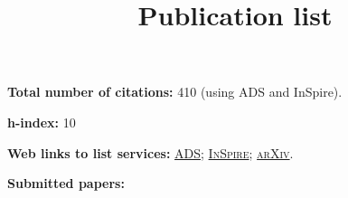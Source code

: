 \documentclass[11pt,letterpaper,sans]{moderncv}   %
\title{Publication list}
\begin{document}
\maketitle


\textcolor{color1}{\textbf{Total number of citations:}} 410 (using ADS and InSpire).

\textcolor{color1}{\textbf{h-index:}} 10


\textcolor{color1}{\textbf{Web links to list services:}}
\href{http://labs.adsabs.harvard.edu/adsabs/search/?q=author%3A%22Gerosa%2C+Davide%22&month_from=&year_from=&month_to=&year_to=&db_f=&nr=&article=1&bigquery=&re_sort_type=CITED&re_sort_dir=desc}{\textsc{ADS}}; 
\href{http://inspirehep.net/search?ln=en&ln=en&p=exactauthor%3AD.Gerosa.1&of=hb&action_search=Search&sf=&so=d&rm=citation&rg=25&sc=0}{\textsc{InSpire}}; 
\href{http://arxiv.org/a/gerosa_d_1.html}{\textsc{arXiv}}.

\vspace{0.7cm}







\textcolor{color1}{\textbf{Submitted papers:}}
\vspace{-0.5cm}
\end{document}
